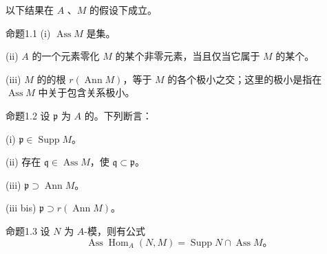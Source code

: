 以下结果在 $A$ 、$M$ 的假设下成立。
\begin{SGAresult}{命题}{1.1}
\textnormal{(i)} $\operatorname{Ass}M$ 是集。

\textnormal{(ii)} $A$ 的一个元素零化 $M$ 的某个非零元素，当且仅当它属于 $M$ 的某个。

\textnormal{(iii)} $M$ 的的根 $r(\operatorname{Ann}M)$，等于 $M$ 的各个极小之交；这里的极小是指在 $\operatorname{Ass}M$ 中关于包含关系极小。
\end{SGAresult}
\begin{SGAresult}{命题}{1.2}
设 $\mathfrak p$ 为 $A$ 的。下列断言：

\textnormal{(i)} $\mathfrak p\in\operatorname{Supp}M$。

\textnormal{(ii)} 存在 $\mathfrak q\in\operatorname{Ass}M$，使 $\mathfrak q\subset\mathfrak p$。

\textnormal{(iii)} $\mathfrak p\supset\operatorname{Ann}M$。

\textnormal{(iii bis)} $\mathfrak p\supset r(\operatorname{Ann}M)$。
\end{SGAresult}
\begin{SGAresult}{命题}{1.3}
设 $N$ 为 $A$-模，则有公式
\[
\operatorname{Ass}\operatorname{Hom}_A(N,M)
=\operatorname{Supp}N\cap\operatorname{Ass}M。
\]
\end{SGAresult}

